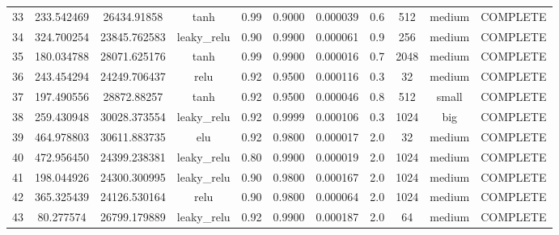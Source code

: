 \begin{longtable}{ccccccccccc}
                       33 &                 233.542469 &                        26434.91858 &            tanh &        0.99 & 0.9000 &       0.000039 &             0.6 &      512 &    medium & COMPLETE \\
                       34 &                 324.700254 &                       23845.762583 &     leaky\_relu &        0.90 & 0.9900 &       0.000061 &             0.9 &      256 &    medium & COMPLETE \\
                       35 &                 180.034788 &                       28071.625176 &            tanh &        0.99 & 0.9900 &       0.000016 &             0.7 &     2048 &    medium & COMPLETE \\
                       36 &                 243.454294 &                       24249.706437 &            relu &        0.92 & 0.9500 &       0.000116 &             0.3 &       32 &    medium & COMPLETE \\
                       37 &                 197.490556 &                        28872.88257 &            tanh &        0.92 & 0.9500 &       0.000046 &             0.8 &      512 &     small & COMPLETE \\
                       38 &                 259.430948 &                       30028.373554 &     leaky\_relu &        0.92 & 0.9999 &       0.000106 &             0.3 &     1024 &       big & COMPLETE \\
                       39 &                 464.978803 &                       30611.883735 &             elu &        0.92 & 0.9800 &       0.000017 &             2.0 &       32 &    medium & COMPLETE \\
                       40 &                 472.956450 &                       24399.238381 &     leaky\_relu &        0.80 & 0.9900 &       0.000019 &             2.0 &     1024 &    medium & COMPLETE \\
                       41 &                 198.044926 &                       24300.300995 &     leaky\_relu &        0.90 & 0.9800 &       0.000167 &             2.0 &     1024 &    medium & COMPLETE \\
                       42 &                 365.325439 &                       24126.530164 &            relu &        0.90 & 0.9800 &       0.000064 &             2.0 &     1024 &    medium & COMPLETE \\
                       43 &                  80.277574 &                       26799.179889 &     leaky\_relu &        0.92 & 0.9900 &       0.000187 &             2.0 &       64 &    medium & COMPLETE \\

\end{longtable}
